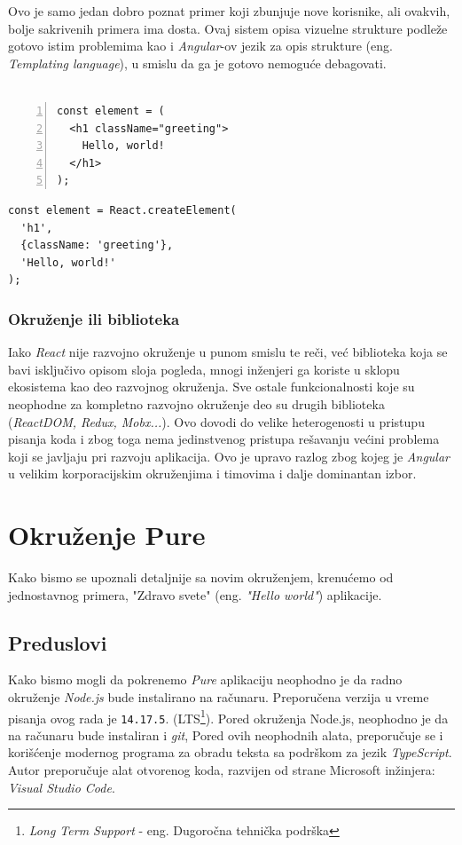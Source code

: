 \documentclass[12pt,oneside]{memoir}
\newcommand{\code}[1]{\colorbox{codegray}{\texttt{\scalebox{0.9}{#1}}}}%
\begin{document}
Ovo je samo jedan dobro poznat primer koji zbunjuje nove korisnike, ali ovakvih, bolje sakrivenih primera ima dosta.
Ovaj sistem opisa vizuelne strukture podleže gotovo istim problemima kao i \emph{Angular}-ov jezik za opis strukture (eng. \emph{Templating language}),
u smislu da ga je gotovo nemoguće debagovati.
\\
\\
\noindent\begin{minipage}[b]{.46\textwidth}
\begin{lstlisting}[style=htmlStyle, numbers=left, numberstyle=\tiny, caption={Fajl \code{ToDoApp.ts}},label=file:react.jsx]
const element = (
  <h1 className="greeting">
    Hello, world!
  </h1>
);
\end{lstlisting}
\end{minipage}
\hfill
\begin{minipage}[b]{.46\textwidth}
\begin{lstlisting}[style=jsStyle, caption={Fajl \code{ToDoApp.ts}},label=file:react.js]
const element = React.createElement(
  'h1',
  {className: 'greeting'},
  'Hello, world!'
);
\end{lstlisting}
\end{minipage}
\subsection{Okruženje ili biblioteka}
Iako \emph{React} nije razvojno okruženje u punom smislu te reči, već biblioteka koja se bavi isključivo opisom sloja pogleda,
mnogi inženjeri ga koriste u sklopu ekosistema kao deo razvojnog okruženja.
Sve ostale funkcionalnosti koje su neophodne za kompletno razvojno okruženje deo su drugih biblioteka (\emph{ReactDOM, Redux, Mobx...}).
Ovo dovodi do velike heterogenosti u pristupu pisanja koda i zbog toga nema jedinstvenog pristupa rešavanju većini problema
koji se javljaju pri razvoju aplikacija. Ovo je upravo razlog zbog kojeg je \emph{Angular} u velikim korporacijskim okruženjima i timovima
i dalje dominantan izbor.
\chapter{Okruženje Pure}
Kako bismo se upoznali detaljnije sa novim okruženjem, krenućemo od jednostavnog
primera, "Zdravo svete" (eng. \emph{"Hello world"}) aplikacije.
\section{Preduslovi}
Kako bismo mogli da pokrenemo \emph{Pure} aplikaciju neophodno je da radno okruženje
\emph{Node.js}\cite{Node} bude instalirano na računaru. Preporučena verzija u vreme pisanja ovog rada je \texttt{14.17.5}.
(LTS\footnote{\emph{Long Term Support} - eng. Dugoročna tehnička podrška}).
Pored okruženja Node.js, neophodno je da na računaru bude instaliran i \emph{git},
Pored ovih neophodnih alata, preporučuje se i korišćenje modernog programa za obradu teksta
sa podrškom za jezik \emph{TypeScript}\cite{TypeScript}. Autor preporučuje alat otvorenog koda, razvijen od strane
Microsoft inžinjera: \emph{Visual Studio Code}\cite{vsc}.
\end{document}
